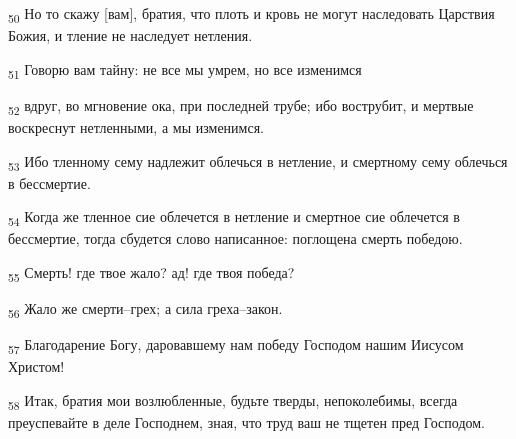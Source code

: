 \begin{tcolorbox}
\textsubscript{50} Но то скажу [вам], братия, что плоть и кровь не могут наследовать Царствия Божия, и тление не наследует нетления.
\end{tcolorbox}
\begin{tcolorbox}
\textsubscript{51} Говорю вам тайну: не все мы умрем, но все изменимся
\end{tcolorbox}
\begin{tcolorbox}
\textsubscript{52} вдруг, во мгновение ока, при последней трубе; ибо вострубит, и мертвые воскреснут нетленными, а мы изменимся.
\end{tcolorbox}
\begin{tcolorbox}
\textsubscript{53} Ибо тленному сему надлежит облечься в нетление, и смертному сему облечься в бессмертие.
\end{tcolorbox}
\begin{tcolorbox}
\textsubscript{54} Когда же тленное сие облечется в нетление и смертное сие облечется в бессмертие, тогда сбудется слово написанное: поглощена смерть победою.
\end{tcolorbox}
\begin{tcolorbox}
\textsubscript{55} Смерть! где твое жало? ад! где твоя победа?
\end{tcolorbox}
\begin{tcolorbox}
\textsubscript{56} Жало же смерти--грех; а сила греха--закон.
\end{tcolorbox}
\begin{tcolorbox}
\textsubscript{57} Благодарение Богу, даровавшему нам победу Господом нашим Иисусом Христом!
\end{tcolorbox}
\begin{tcolorbox}
\textsubscript{58} Итак, братия мои возлюбленные, будьте тверды, непоколебимы, всегда преуспевайте в деле Господнем, зная, что труд ваш не тщетен пред Господом.
\end{tcolorbox}
